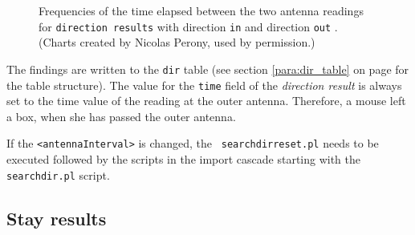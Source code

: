\begin{figure}[htpb]%
	\centering 
	\qquad 
	\caption[Frequencies of the elapsed time between the antenna readings of direction results]{Frequencies of the time elapsed between the two antenna readings for \lstinline|direction results| with direction \lstinline|in|  and direction \lstinline|out| . \footnotesize(Charts created by Nicolas Perony, used by permission.)} 
	 
\end{figure}

The findings are written to the \lstinline|dir| table (see section \ref{para:dir_table} on page \pageref{para:dir_table} for the table structure). The value for the \lstinline|time| field of the \textit{direction result} is always set to the time value of the reading at the outer antenna. Therefore, a mouse left a box, when she has passed the outer antenna.

If the \lstinline|<antennaInterval>| is changed, the \lstinline| searchdirreset.pl| needs to be executed followed by the scripts in the import cascade starting with the \lstinline|searchdir.pl| script.

\subsection{Stay results}
\label{subsec:stayres}

